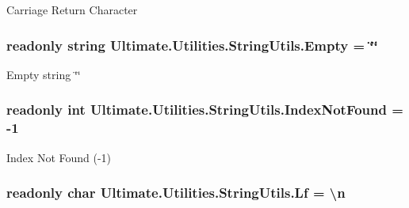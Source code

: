 Carriage Return Character \textquotesingle{}\textquotesingle{} 

\subsubsection[{\texorpdfstring{Empty}{Empty}}]{\setlength{\rightskip}{0pt plus 5cm}readonly string Ultimate.\+Utilities.\+String\+Utils.\+Empty = \char`\"{}\char`\"{}\hspace{0.3cm}{\ttfamily [static]}}\hypertarget{class_ultimate_1_1_utilities_1_1_string_utils_a9b3c4479543bf534b42010d42af2ebb9}{}\label{class_ultimate_1_1_utilities_1_1_string_utils_a9b3c4479543bf534b42010d42af2ebb9}


Empty string \char`\"{}\char`\"{} 

\subsubsection[{\texorpdfstring{Index\+Not\+Found}{IndexNotFound}}]{\setlength{\rightskip}{0pt plus 5cm}readonly int Ultimate.\+Utilities.\+String\+Utils.\+Index\+Not\+Found = -\/1\hspace{0.3cm}{\ttfamily [static]}}\hypertarget{class_ultimate_1_1_utilities_1_1_string_utils_a0ea1f1d056068a2c8014715eb30c5c33}{}\label{class_ultimate_1_1_utilities_1_1_string_utils_a0ea1f1d056068a2c8014715eb30c5c33}


Index Not Found (-\/1) 

\subsubsection[{\texorpdfstring{Lf}{Lf}}]{\setlength{\rightskip}{0pt plus 5cm}readonly char Ultimate.\+Utilities.\+String\+Utils.\+Lf = \textquotesingle{}\textbackslash{}n\textquotesingle{}\hspace{0.3cm}{\ttfamily [static]}}\hypertarget{class_ultimate_1_1_utilities_1_1_string_utils_a2be81a54a2550214757c0d0931520bed}{}\label{class_ultimate_1_1_utilities_1_1_string_utils_a2be81a54a2550214757c0d0931520bed}


